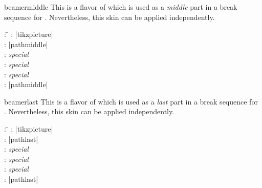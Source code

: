 \begin{dispExample}
\end{dispExample}


\medskip

\begin{docSkin}{beamermiddle}
This is a flavor of  which is used as a \emph{middle} part
in a break sequence for .
Nevertheless, this skin can be applied independently.
\begin{tcolorbox}[skintable=beamermiddle]
  \begin{tabbing}
    : \=\kill
    :  \> |tikzpicture|\\ 
    :           \> |pathmiddle|\\
    : \> \emph{special}\\ 
    :        \> \emph{special}\\
    :    \> \emph{special}\\
    :           \> |pathmiddle|
  \end{tabbing}
\end{tcolorbox}
\end{docSkin}


\begin{dispExample}
\end{dispExample}


\clearpage
\begin{docSkin}{beamerlast}
This is a flavor of  which is used as a \emph{last} part
in a break sequence for .
Nevertheless, this skin can be applied independently.
\begin{tcolorbox}[skintable=beamerlast]
  \begin{tabbing}
    : \=\kill
    :  \> |tikzpicture|\\ 
    :           \> |pathlast|\\
    : \> \emph{special}\\ 
    :        \> \emph{special}\\
    :    \> \emph{special}\\
    :           \> |pathlast|
  \end{tabbing}
\end{tcolorbox}
\end{docSkin}

